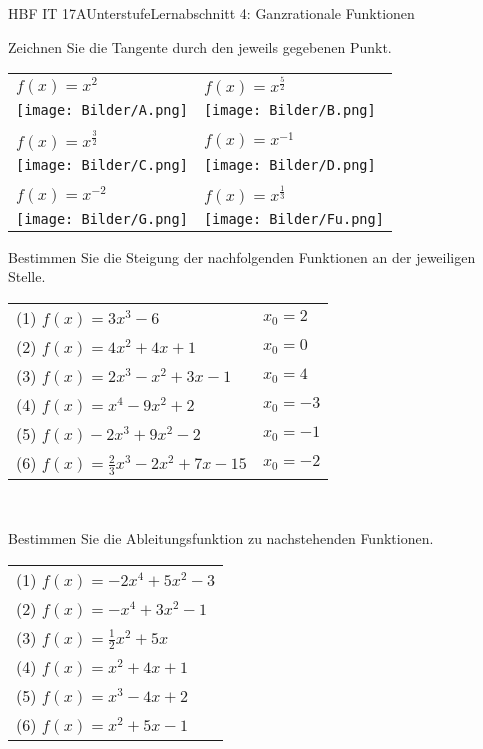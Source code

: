 \documentclass[oneside,openany,headings=optiontotoc,11pt,numbers=noenddot]{scrreprt}
\begin{document}
	\begin{worksheet}{HBF IT 17A}{Unterstufe}{Lernabschnitt 4: Ganzrationale Funktionen}
		
		\noindent
		\begin{framed}
			\noindent
			Zeichnen Sie die Tangente durch den jeweils gegebenen Punkt.
			\begin{center}
				\begin{tabularx}{\textwidth}{XX}
					\(f(x) = x^2\) & \(f(x) = x^{\frac{5}{2}}\)\\
					\texttt{[image: Bilder/A.png]} & \texttt{[image: Bilder/B.png]}\\
					\hline\\
					\(f(x)=x^{\frac{3}{2}}\) & \(f(x) = x^{-1}\)\\
					\texttt{[image: Bilder/C.png]} & \texttt{[image: Bilder/D.png]}\\
					\hline\\
					\(f(x) = x^{-2}\) & \(f(x) = x^{\frac{1}{3}}\)\\		
					\texttt{[image: Bilder/G.png]} & \texttt{[image: Bilder/Fu.png]}\\
				\end{tabularx}
			\end{center}
			\newpage
			\noindent
			Bestimmen Sie die Steigung der nachfolgenden Funktionen an der jeweiligen Stelle.\\
			\par\noindent
			\begin{tabular}{ll}
				(1) \(f(x) = 3x^3-6\) & \(x_0 = 2\) \\
				(2) \(f(x) = 4x^2 +4x +1\) & \( x_0 = 0\)\\
				(3) \(f(x) = 2x^3-x^2+3x-1\) & \(x_0 = 4\)\\
				(4) \(f(x) = x^4-9x^2+2\) & \(x_0 = -3\)\\
				(5) \(f(x)-2x^3+9x^2-2\) & \(x_0=-1\)\\
				(6) \(f(x) = \frac{2}{3}x^3 -2x^2+7x -15\) & \(x_0=-2\)
			\end{tabular}\\
			\par\bigskip\noindent
			Bestimmen Sie die Ableitungsfunktion zu nachstehenden Funktionen.\\
			\par\noindent
			\begin{tabular}{l}
				(1) \(f(x) = -2x^4+5x^2-3\)\\
				(2) \(f(x) = -x^4+3x^2-1\)\\
				(3) \(f(x) = \frac{1}{2}x^2+5x\)\\
				(4) \(f(x) = x^2 + 4x +1\)\\
				(5) \(f(x) = x^3-4x+2\)\\
				(6) \(f(x) = x^2+5x-1\)
			\end{tabular}
		\end{framed}
	\end{worksheet}
\end{document}
